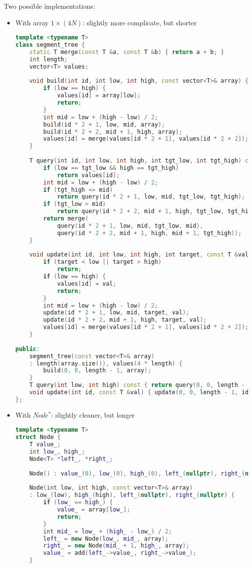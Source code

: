 Two possible implementations:
\begin{itemize}
	\item With array $ 1 \times (4N) $: slightly more complicate, but shorter
\begin{lstlisting}[language=C++]
template <typename T>
class segment_tree {
	static T merge(const T &a, const T &b) { return a + b; }
	int length;
	vector<T> values;
	
	void build(int id, int low, int high, const vector<T>& array) {
		if (low == high) {
			values[id] = array[low];
			return;
		}
		int mid = low + (high - low) / 2;
		build(id * 2 + 1, low, mid, array);
		build(id * 2 + 2, mid + 1, high, array);
		values[id] = merge(values[id * 2 + 1], values[id * 2 + 2]);
	}
	
	T query(int id, int low, int high, int tgt_low, int tgt_high) const {
		if (low == tgt_low && high == tgt_high)
			return values[id];
		int mid = low + (high - low) / 2;
		if (tgt_high <= mid)
			return query(id * 2 + 1, low, mid, tgt_low, tgt_high);
		if (tgt_low > mid)
			return query(id * 2 + 2, mid + 1, high, tgt_low, tgt_high);
		return merge(
			query(id * 2 + 1, low, mid, tgt_low, mid),
			query(id * 2 + 2, mid + 1, high, mid + 1, tgt_high)); 
	}
	
	void update(int id, int low, int high, int target, const T &val) {
		if (target < low || target > high)
			return;
		if (low == high) {
			values[id] = val;
			return;
		}
		int mid = low + (high - low) / 2;
		update(id * 2 + 1, low, mid, target, val);
		update(id * 2 + 2, mid + 1, high, target, val);
		values[id] = merge(values[id * 2 + 1], values[id * 2 + 2]);
	}
	
public:
	segment_tree(const vector<T>& array)
	: length(array.size()), values(4 * length) {
		build(0, 0, length - 1, array);
	}
	T query(int low, int high) const { return query(0, 0, length - 1, low, high); }
	void update(int id, const T &val) { update(0, 0, length - 1, id, val); }
};
\end{lstlisting}
	\item With $ Node^* $: slightly cleaner, but longer
\begin{lstlisting}[language=C++]
template <typename T>
struct Node {
	T value_;
	int low_, high_;
	Node<T> *left_, *right_;
	
	Node() : value_(0), low_(0), high_(0), left_(nullptr), right_(nullptr) {};
	
	Node(int low, int high, const vector<T>& array)
	: low_(low), high_(high), left_(nullptr), right_(nullptr) {
		if (low_ == high_) {
			value_ = array[low_];
			return;
		}
		int mid_ = low_ + (high_ - low_) / 2;
		left_ = new Node(low_, mid_, array);
		right_ = new Node(mid_ + 1, high_, array);
		value_ = add(left_->value_, right_->value_);
	}
	

\end{lstlisting}
\end{itemize}

